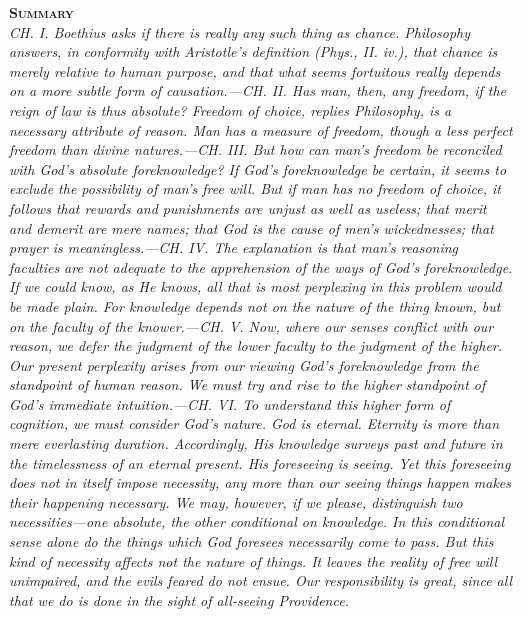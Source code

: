 \documentclass[11pt]{book}
\newenvironment{abstract}%
  {\noindent \textbf{\scshape Summary} \\ \rightskip1in\itshape\small}%
  {\bigskip}
\begin{document}
\begin{abstract}
     CH. I. Boethius asks if there is really any such thing as chance.
     Philosophy answers, in conformity with Aristotle's definition
     (Phys., II. iv.), that chance is merely relative to human purpose,
     and that what seems fortuitous really depends on a more subtle form
     of causation.---CH. II. Has man, then, any freedom, if the reign of
     law is thus absolute? Freedom of choice, replies Philosophy, is a
     necessary attribute of reason. Man has a measure of freedom, though
     a less perfect freedom than divine natures.---CH. III. But how can
     man's freedom be reconciled with God's absolute foreknowledge? If
     God's foreknowledge be certain, it seems to exclude the possibility
     of man's free will. But if man has no freedom of choice, it
     follows that rewards and punishments are unjust as well as useless;
     that merit and demerit are mere names; that God is the cause of
     men's wickednesses; that prayer is meaningless.---CH. IV. The
     explanation is that man's reasoning faculties are not adequate to
     the apprehension of the ways of God's foreknowledge. If we could
     know, as He knows, all that is most perplexing in this problem
     would be made plain. For knowledge depends not on the nature of the
     thing known, but on the faculty of the knower.---CH. V. Now, where
     our senses conflict with our reason, we defer the judgment of the
     lower faculty to the judgment of the higher. Our present perplexity
     arises from our viewing God's foreknowledge from the standpoint of
     human reason. We must try and rise to the higher standpoint of
     God's immediate intuition.---CH. VI. To understand this higher form
     of cognition, we must consider God's nature. God is eternal.
     Eternity is more than mere everlasting duration. Accordingly, His
     knowledge surveys past and future in the timelessness of an eternal
     present. His foreseeing is seeing. Yet this foreseeing does not in
     itself impose necessity, any more than our seeing things happen
     makes their happening necessary. We may, however, if we please,
     distinguish two necessities---one absolute, the other conditional on
     knowledge. In this conditional sense alone do the things which God
     foresees necessarily come to pass. But this kind of necessity
     affects not the nature of things. It leaves the reality of free
     will unimpaired, and the evils feared do not ensue. Our
     responsibility is great, since all that we do is done in the sight
     of all-seeing Providence.
\end{abstract}
\end{document}
